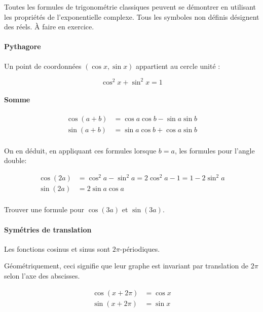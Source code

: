 Toutes les formules de trigonométrie classiques peuvent se démontrer en utilisant les propriétés de l'exponentielle complexe. Tous les symboles non définis désignent des réels. À faire en exercice.

\paragraph{Pythagore}

Un point de coordonnées $(\cos x,\sin x)$ appartient au cercle unité :

\[ \cos^2x+\sin^2x = 1\]

\paragraph{Somme}

\begin{align*}
\cos(a+b) &= \cos a \cos b - \sin a \sin b\\
\sin(a+b )&= \sin a \cos b + \cos a \sin b\\
\end{align*}

On en déduit, en appliquant ces formules lorsque $b=a$, les formules pour l'angle double:

\begin{align*}
\cos(2a) &= \cos^2 a - \sin^2 a = 2\cos^2 a-1 = 1-2\sin^2 a\\
\sin(2a)&= 2\sin a \cos a \\
\end{align*}

\begin{exo}
Trouver une formule pour $\cos(3a)$ et $\sin(3a)$.
\end{exo}

\paragraph{Symétries de translation}

Les fonctions cosinus et sinus sont $2\pi$-périodiques.
\begin{remarque}
Géométriquement, ceci signifie que leur graphe est invariant par translation de $2\pi$ selon l'axe des abscisses.
\end{remarque}


\begin{align*}
\cos(x+2\pi)&=\cos x\\
\sin(x+2\pi)&=\sin x
\end{align*}

